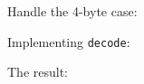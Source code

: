 \documentclass[../index.tex]{subfiles}
\begin{document}
\begin{frame}{\currenttitle}
%
%
  Handle the 4-byte case: \\[1em]
\end{frame}

\begin{frame}{\currenttitle}
%
%
  Implementing \texttt{decode}: \\[1em]
\end{frame}

\begin{frame}[fragile]{\currenttitle}
%
%
%
  

  \vspace*{1em}

  The result:

  
\end{frame}
\end{document}
